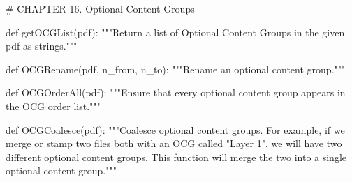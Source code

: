 # CHAPTER 16. Optional Content Groups

def getOCGList(pdf):
    """Return a list of Optional Content Groups in the given pdf as strings."""

def OCGRename(pdf, n_from, n_to):
    """Rename an optional content group."""

def OCGOrderAll(pdf):
    """Ensure that every optional content group appears in the OCG order list."""

def OCGCoalesce(pdf):
    """Coalesce optional content groups. For example, if we merge or stamp two
    files both with an OCG called "Layer 1", we will have two different
    optional content groups. This function will merge the two into a single
    optional content group."""
